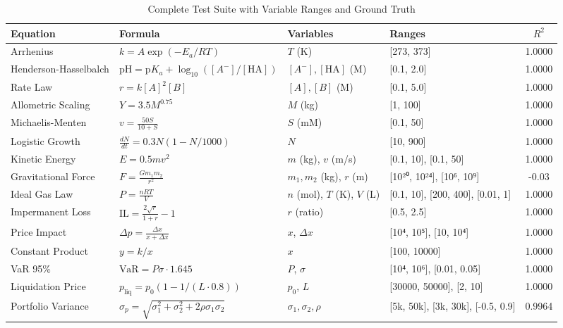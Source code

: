 \documentclass[twoside,11pt]{article}
\begin{document}
\begin{table}[htbp]
\centering
\caption{Complete Test Suite with Variable Ranges and Ground Truth}
\label{tab:test_suite_full}
\tiny
\begin{tabular}{llllc}
\toprule
\textbf{Equation} & \textbf{Formula} & \textbf{Variables} & \textbf{Ranges} & \textbf{$R^2$} \\
\midrule
Arrhenius & $k = A\exp(-E_a/RT)$ & $T$ (K) & [273, 373] & 1.0000 \\
Henderson-Hasselbalch & $\text{pH} = \text{p}K_a + \log_{10}([A^-]/[\text{HA}])$ & $[A^-], [\text{HA}]$ (M) & [0.1, 2.0] & 1.0000 \\
Rate Law & $r = k[A]^2[B]$ & $[A], [B]$ (M) & [0.1, 5.0] & 1.0000 \\
Allometric Scaling & $Y = 3.5M^{0.75}$ & $M$ (kg) & [1, 100] & 1.0000 \\
Michaelis-Menten & $v = \frac{50S}{10 + S}$ & $S$ (mM) & [0.1, 50] & 1.0000 \\
Logistic Growth & $\frac{dN}{dt} = 0.3N(1 - N/1000)$ & $N$ & [10, 900] & 1.0000 \\
Kinetic Energy & $E = 0.5mv^2$ & $m$ (kg), $v$ (m/s) & [0.1, 10], [0.1, 50] & 1.0000 \\
Gravitational Force & $F = \frac{Gm_1m_2}{r^2}$ & $m_1, m_2$ (kg), $r$ (m) & [10²⁰, 10²⁴], [10⁶, 10⁹] & -0.03 \\
Ideal Gas Law & $P = \frac{nRT}{V}$ & $n$ (mol), $T$ (K), $V$ (L) & [0.1, 10], [200, 400], [0.01, 1] & 1.0000 \\
Impermanent Loss & $\text{IL} = \frac{2\sqrt{r}}{1+r} - 1$ & $r$ (ratio) & [0.5, 2.5] & 1.0000 \\
Price Impact & $\Delta p = \frac{\Delta x}{x + \Delta x}$ & $x$, $\Delta x$ & [10⁴, 10⁵], [10, 10⁴] & 1.0000 \\
Constant Product & $y = k/x$ & $x$ & [100, 10000] & 1.0000 \\
VaR 95\% & $\text{VaR} = P\sigma \cdot 1.645$ & $P$, $\sigma$ & [10⁴, 10⁶], [0.01, 0.05] & 1.0000 \\
Liquidation Price & $p_{\text{liq}} = p_0(1 - 1/(L \cdot 0.8))$ & $p_0$, $L$ & [30000, 50000], [2, 10] & 1.0000 \\
Portfolio Variance & $\sigma_p = \sqrt{\sigma_1^2 + \sigma_2^2 + 2\rho\sigma_1\sigma_2}$ & $\sigma_1, \sigma_2, \rho$ & [5k, 50k], [3k, 30k], [-0.5, 0.9] & 0.9964 \\
\bottomrule
\end{tabular}
\end{table}
\end{document}
